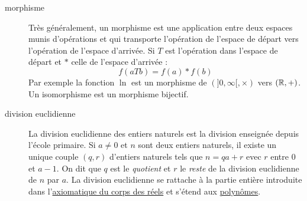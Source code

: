 \begin{description}
\item[morphisme]  Très généralement, un morphisme est une application entre deux espaces munis d'opérations et qui transporte l'opération de l'espace de départ vers l'opération de l'espace d'arrivée. Si $T$ est l'opération dans l'espace de départ et $*$ celle de l'espace d'arrivée :
\begin{displaymath}
 f(a T b) = f(a) * f(b)
\end{displaymath}
Par exemple la fonction $\ln$ est un morphisme de $(]0,\infty[,\times)$ vers $(\mathbb{R},+)$. \newline
Un isomorphisme est un morphisme bijectif.

\item[division euclidienne]
La division euclidienne des entiers naturels est la division enseignée depuis l'école primaire.\newline
Si $a\neq 0$ et $n$ sont deux entiers naturels, il existe un unique couple $(q,r)$ d'entiers naturels tels que $n=qa+r$ evec $r$ entre $0$ et $a-1$. On dit que $q$ est le \emph{quotient} et $r$ le \emph{reste} de la division euclidienne de $n$ par $a$.\newline
La division euclidienne se rattache à la partie entière introduite dans l'\href{\baseurl C2192.pdf}{axiomatique du corps des réels} et s'étend aux \href{\baseurl C1622.pdf}{polynômes}. 
 
\end{description}


